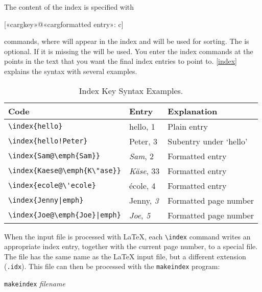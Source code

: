 The content of the index is specified with
\begin{lscommand}
  [{{«\bs carg{key}»@«\bs carg{formatted entry}»}}: c]
\end{lscommand}
\noindent commands, where  will appear in the index
and  will be used for sorting.  The  is
optional. If it is missing the  will be used. You enter the index
commands at the points in the text that you want the final index entries to
point to. \autoref{index} explains the syntax with several examples.

\begin{table}[!tp]
  \centering
  \caption{Index Key Syntax Examples.}\label{index}
  \begin{tabular}{@{}lll@{}}
    \toprule
    Code                                   & Entry                 & Explanation            \\
    \midrule
    \rule{0pt}{1.05em}\verb|\index{hello}| & hello, 1              & Plain entry            \\
    \verb|\index{hello!Peter}|             & \hspace*{2ex}Peter, 3 & Subentry under `hello' \\
    \verb|\index{Sam@\emph{Sam}}|          & \emph{Sam}, 2         & Formatted entry        \\
    \verb|\index{Kaese@\emph{K\"ase}}|     & \emph{K\"ase}, 33     & Formatted entry        \\
    \verb.\index{ecole@\'ecole}.           & \'ecole, 4            & Formatted entry        \\
    \verb.\index{Jenny|emph}.              & Jenny, \emph{3}       & Formatted page number  \\
    \verb.\index{Joe@\emph{Joe}|emph}.     & \emph{Joe}, \emph{5}  & Formatted page number  \\
    \bottomrule
  \end{tabular}
\end{table}

When the input file is processed with \LaTeX{}, each \verb|\index|
command writes an appropriate index entry, together with the current
page number, to a special file. The file has the same name as the
\LaTeX{} input file, but a different extension (\verb|.idx|). This
 file can then be processed with the \texttt{makeindex}
program:
\begin{lscommand}
  \texttt{makeindex} \emph{filename}
\end{lscommand}

